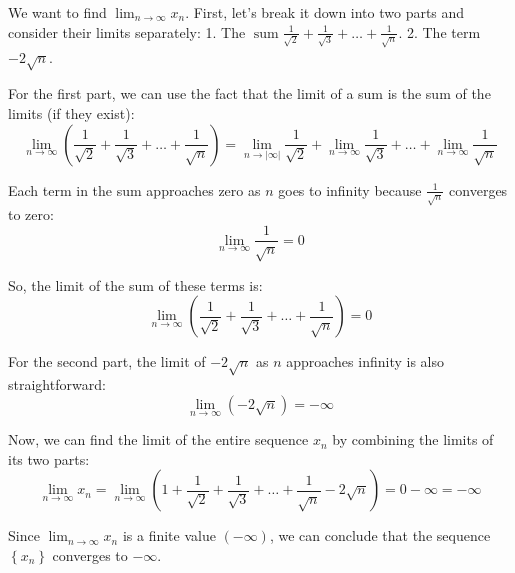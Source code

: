 \documentclass{report}
\begin{document}
We want to find $\lim _{n \rightarrow \infty} x_n$. First, let's break it down into two parts and consider their limits separately:
1. The $\operatorname{sum} \frac{1}{\sqrt{2}}+\frac{1}{\sqrt{3}}+\ldots+\frac{1}{\sqrt{n}}$.
2. The term $-2 \sqrt{n}$.

For the first part, we can use the fact that the limit of a sum is the sum of the limits (if they exist):
$$
\lim _{n \rightarrow \infty}\left(\frac{1}{\sqrt{2}}+\frac{1}{\sqrt{3}}+\ldots+\frac{1}{\sqrt{n}}\right)=\lim _{n \rightarrow|\infty|} \frac{1}{\sqrt{2}}+\lim _{n \rightarrow \infty} \frac{1}{\sqrt{3}}+\ldots+\lim _{n \rightarrow \infty} \frac{1}{\sqrt{n}}
$$

Each term in the sum approaches zero as $n$ goes to infinity because $\frac{1}{\sqrt{n}}$ converges to zero:
$$
\lim _{n \rightarrow \infty} \frac{1}{\sqrt{n}}=0
$$

So, the limit of the sum of these terms is:
$$
\lim _{n \rightarrow \infty}\left(\frac{1}{\sqrt{2}}+\frac{1}{\sqrt{3}}+\ldots+\frac{1}{\sqrt{n}}\right)=0
$$

For the second part, the limit of $-2 \sqrt{n}$ as $n$ approaches infinity is also straightforward:
$$
\lim _{n \rightarrow \infty}(-2 \sqrt{n})=-\infty
$$

Now, we can find the limit of the entire sequence $x_n$ by combining the limits of its two parts:
$$
\lim _{n \rightarrow \infty} x_n=\lim _{n \rightarrow \infty}\left(1+\frac{1}{\sqrt{2}}+\frac{1}{\sqrt{3}}+\ldots+\frac{1}{\sqrt{n}}-2 \sqrt{n}\right)=0-\infty=-\infty
$$

Since $\lim _{n \rightarrow \infty} x_n$ is a finite value $(-\infty)$, we can conclude that the sequence $\left\{x_n\right\}$ converges to $-\infty$.
\end{document}
